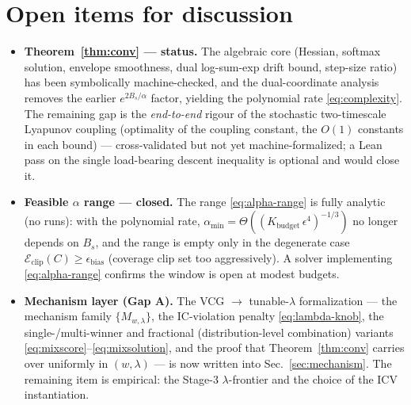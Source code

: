 \documentclass[11pt]{article}
\begin{document}
\section*{Open items for discussion}
\begin{itemize}[topsep=2pt,itemsep=1pt]
  \item \textbf{Theorem~\ref{thm:conv} --- status.} The algebraic core (Hessian, softmax solution, envelope smoothness, dual log-sum-exp drift bound, step-size ratio) has been symbolically machine-checked, and the dual-coordinate analysis removes the earlier $e^{2B_s/\alpha}$ factor, yielding the polynomial rate \eqref{eq:complexity}. The remaining gap is the \emph{end-to-end} rigour of the stochastic two-timescale Lyapunov coupling (optimality of the coupling constant, the $O(1)$ constants in each bound) --- cross-validated but not yet machine-formalized; a Lean pass on the single load-bearing descent inequality is optional and would close it.
  \item \textbf{Feasible $\alpha$ range --- closed.} The range \eqref{eq:alpha-range} is fully analytic (no runs): with the polynomial rate, $\alpha_{\min}=\Theta((K_{\mathrm{budget}}\,\epsilon^{4})^{-1/3})$ no longer depends on $B_s$, and the range is empty only in the degenerate case $\mathcal{E}_{\mathrm{clip}}(C)\ge\epsilon_{\mathrm{bias}}$ (coverage clip set too aggressively). A solver implementing \eqref{eq:alpha-range} confirms the window is open at modest budgets.
  \item \textbf{Mechanism layer (Gap A).} The VCG $\to$ tunable-$\lambda$ formalization --- the mechanism family $\{M_{w,\lambda}\}$, the IC-violation penalty \eqref{eq:lambda-knob}, the single-/multi-winner and fractional (distribution-level combination) variants \eqref{eq:mixscore}--\eqref{eq:mixsolution}, and the proof that Theorem~\ref{thm:conv} carries over uniformly in $(w,\lambda)$ --- is now written into Sec.~\ref{sec:mechanism}. The remaining item is empirical: the Stage-3 $\lambda$-frontier and the choice of the $\mathrm{ICV}$ instantiation.
\end{itemize}
\end{document}

